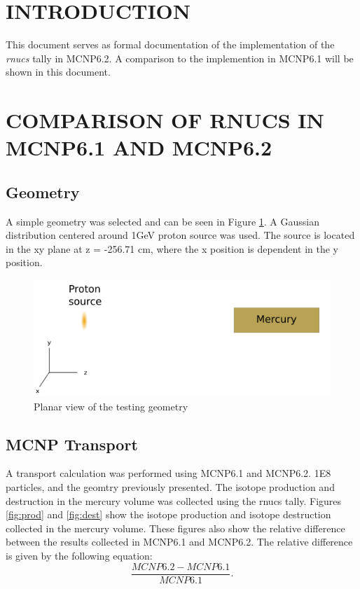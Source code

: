 \section{INTRODUCTION}

This document serves as formal documentation of the implementation of
the \textit{rnucs} tally in MCNP6.2. A comparison to the implemention
in MCNP6.1 will be shown in this document. 

\section{COMPARISON OF RNUCS IN MCNP6.1 AND MCNP6.2}

\subsection{Geometry}
A simple geometry was selected and can be seen in Figure \ref{fig:merbox.png}.
A Gaussian distribution centered around 1GeV proton source was used. 
The source is located in the xy plane at z = -256.71 cm, where the x position is
dependent in the y position. 


\begin{figure}[h!]
        \centering
        \includegraphics[scale=0.7]{figs/mercury.png}
        \caption[VPI]{Planar view of the testing geometry}
        \label{fig:merbox.png}
\end{figure}


\subsection{MCNP Transport}
A transport calculation was performed using MCNP6.1 and MCNP6.2.
1E8 particles, and the geomtry previously presented. 
The isotope production and destruction in the mercury volume was collected
using the rnucs tally. 
Figures \ref{fig:prod} and \ref{fig:dest}  show the isotope production
and isotope destruction collected in the mercury volume. These figures also
show the relative difference between the results collected in MCNP6.1
and MCNP6.2. 
The relative difference is given by the following equation:
\begin{equation}
	\frac{MCNP6.2 - MCNP6.1}{MCNP6.1}.
\end{equation}


